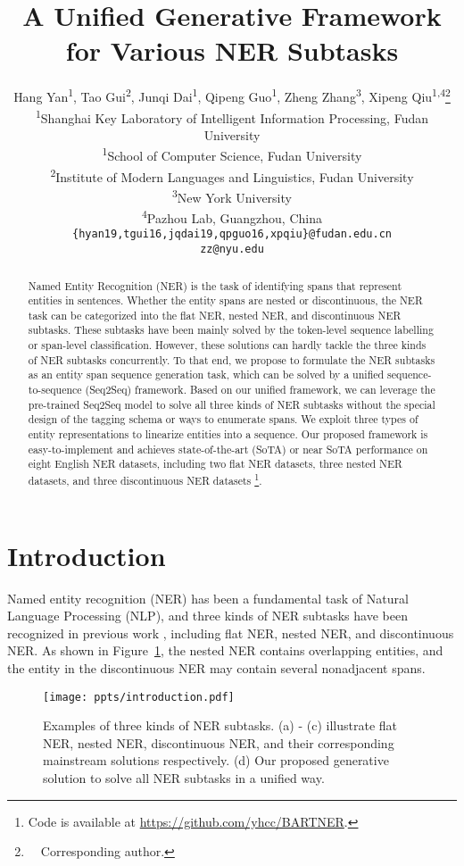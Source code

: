 \documentclass[11pt,a4paper]{article}
\title{A Unified Generative Framework for Various NER Subtasks}
\author{Hang Yan\textsuperscript{1}, Tao Gui\textsuperscript{2}, Junqi Dai\textsuperscript{1}, Qipeng Guo\textsuperscript{1}, Zheng Zhang\textsuperscript{3}, Xipeng Qiu\textsuperscript{1,4}\thanks{\ \  Corresponding author.}\\
  \textsuperscript{1}Shanghai Key Laboratory of Intelligent Information Processing, Fudan University \\
  \textsuperscript{1}School of Computer Science, Fudan University \\
  \textsuperscript{2}Institute of Modern Languages and Linguistics, Fudan University \\
  \textsuperscript{3}New York University \\
  \textsuperscript{4}Pazhou Lab, Guangzhou, China \\
  \texttt{\{hyan19,tgui16,jqdai19,qpguo16,xpqiu\}@fudan.edu.cn}\\
  \texttt{zz@nyu.edu}\\}
\date{}
\begin{document}
\maketitle
\begin{abstract}
  Named Entity Recognition (NER) is the task of identifying spans that represent entities in sentences. Whether the entity spans are nested or discontinuous, the NER task can be categorized into the flat NER, nested NER, and discontinuous NER subtasks. These subtasks have been mainly solved by the token-level sequence labelling or span-level classification. However, these solutions can hardly tackle the three kinds of NER subtasks concurrently. To that end, we propose to formulate the NER subtasks as an entity span sequence generation task, which can be solved by a unified sequence-to-sequence (Seq2Seq) framework. Based on our unified framework, we can leverage the pre-trained Seq2Seq model to solve all three kinds of NER subtasks without the special design of the tagging schema or ways to enumerate spans. We exploit three types of entity representations to linearize entities into a sequence. Our proposed framework is easy-to-implement and achieves state-of-the-art (SoTA) or near SoTA performance on eight English NER datasets, including two flat NER datasets, three nested NER datasets, and three discontinuous NER datasets \footnote{Code is available at \url{https://github.com/yhcc/BARTNER}.}.
\end{abstract}


\section{Introduction} \label{sec:intro}

Named entity recognition (NER) has been a fundamental task of Natural Language Processing (NLP), and three kinds of NER subtasks have been recognized in previous work \citep{DBLP:conf/conll/SangM03,DBLP:conf/clef/PradhanESMCVSCS13,DBLP:conf/lrec/DoddingtonMPRSW04,DBLP:conf/ismb/KimOTT03,DBLP:journals/jbi/KarimiMKW15}, including flat NER, nested NER, and discontinuous NER.
As shown in Figure~\ref{fig:example}, the nested NER contains overlapping entities, and the entity in the discontinuous NER may contain several nonadjacent spans.


\begin{figure}[!h]
  \centering
  \texttt{[image: ppts/introduction.pdf]} \label{fig:example}
  \vspace{-0.3em}
  \caption{Examples of three kinds of NER subtasks. (a) - (c) illustrate flat NER, nested NER, discontinuous NER, and their corresponding mainstream solutions respectively. (d) Our proposed generative solution to solve all NER subtasks in a unified way.} \label{fig:example}
\end{figure}
\end{document}
